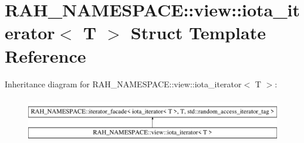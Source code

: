\hypertarget{struct_r_a_h___n_a_m_e_s_p_a_c_e_1_1view_1_1iota__iterator}{}\section{R\+A\+H\+\_\+\+N\+A\+M\+E\+S\+P\+A\+CE\+::view\+::iota\+\_\+iterator$<$ T $>$ Struct Template Reference}
\label{struct_r_a_h___n_a_m_e_s_p_a_c_e_1_1view_1_1iota__iterator}
Inheritance diagram for R\+A\+H\+\_\+\+N\+A\+M\+E\+S\+P\+A\+CE\+::view\+::iota\+\_\+iterator$<$ T $>$\+:\begin{figure}[H]
\begin{center}
\leavevmode
\includegraphics[height=2.000000cm]{struct_r_a_h___n_a_m_e_s_p_a_c_e_1_1view_1_1iota__iterator}
\end{center}
\end{figure}
